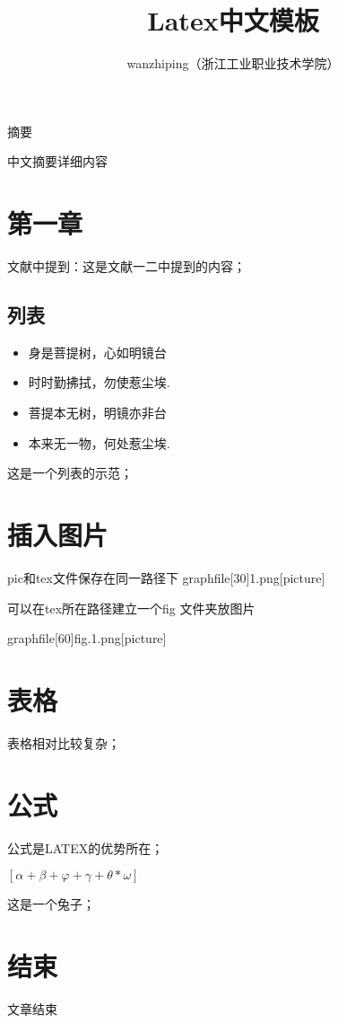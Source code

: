 \documentclass[UTF8,a4paper,10pt]{article}
\title{\textbf{\huge{Latex中文模板}}}
\author{wanzhiping（浙江工业职业技术学院）}
\begin{document}
\maketitle

\begin{center}摘要\end{center}
中文摘要详细内容

\tableofcontents

\section{第一章}
\indent 文献中提到：这是文献一二中提到的内容；
\subsection{列表}
\begin{itemize}  \item 身是菩提树，心如明镜台  \item 时时勤拂拭，勿使惹尘埃.  \item 菩提本无树，明镜亦非台  \item 本来无一物，何处惹尘埃.  \end{itemize}\par
这是一个列表的示范；

\section{插入图片}
pic和tex文件保存在同一路径下  graphfile[30]1.png[picture]\par
可以在tex所在路径建立一个fig 文件夹放图片\par
graphfile[60]fig.1.png[picture]\par

\section{表格}
表格相对比较复杂；\newpage

\section{公式}
公式是LATEX的优势所在； \par
\indent 
$[\alpha + \beta + \varphi + \gamma + \theta * \omega]$
\vspace{3ex}\par
\indent 这是一个兔子；

\section{结束}
 文章结束
\clearpage
\end{document}
